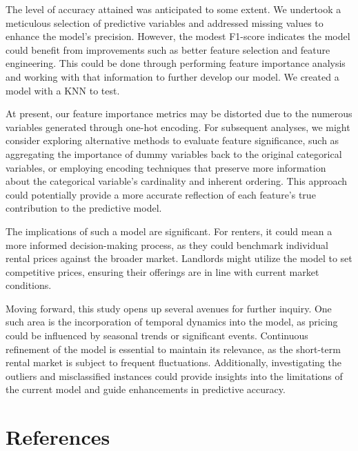 \documentclass[
  letterpaper,
  DIV=11,
  numbers=noendperiod]{scrartcl}
\begin{document}
The level of accuracy attained was anticipated to some extent. We
undertook a meticulous selection of predictive variables and addressed
missing values to enhance the model's precision. However, the modest
F1-score indicates the model could benefit from improvements such as
better feature selection and feature engineering. This could be done
through performing feature importance analysis and working with that
information to further develop our model. We created a model with a KNN
to test.

At present, our feature importance metrics may be distorted due to the
numerous variables generated through one-hot encoding. For subsequent
analyses, we might consider exploring alternative methods to evaluate
feature significance, such as aggregating the importance of dummy
variables back to the original categorical variables, or employing
encoding techniques that preserve more information about the categorical
variable's cardinality and inherent ordering. This approach could
potentially provide a more accurate reflection of each feature's true
contribution to the predictive model.

The implications of such a model are significant. For renters, it could
mean a more informed decision-making process, as they could benchmark
individual rental prices against the broader market. Landlords might
utilize the model to set competitive prices, ensuring their offerings
are in line with current market conditions.

Moving forward, this study opens up several avenues for further inquiry.
One such area is the incorporation of temporal dynamics into the model,
as pricing could be influenced by seasonal trends or significant events.
Continuous refinement of the model is essential to maintain its
relevance, as the short-term rental market is subject to frequent
fluctuations. Additionally, investigating the outliers and misclassified
instances could provide insights into the limitations of the current
model and guide enhancements in predictive accuracy.

\section*{References}\label{references}
\end{document}

